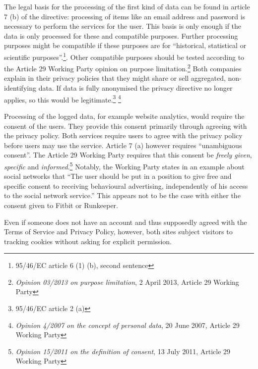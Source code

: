 \documentclass{article}
\begin{document}
The legal basis for the processing of the first kind of data can be found in article 7 (b) of the directive: processing of items like an email address and password is necessary to perform the services for the user.
This basis is only enough if the data is only processed for these and compatible purposes.
Further processing purposes might be compatible if these purposes are for ``historical, statistical or scientific purposes''.\footnote{95/46/EC article 6 (1) (b), second sentence}.
Other compatible purposes should be tested according to the Article 29 Working Party opinion on purpose limitation.\footnote{\emph{Opinion 03/2013 on purpose limitation}, 2 April 2013, Article 29 Working Party}
Both companies explain in their privacy policies that they might share or sell aggregated, non-identifying data.
If data is fully anonymised the privacy directive no longer applies, so this would be legitimate.\footnote{95/46/EC article 2 (a)} \footnote{\emph{Opinion 4/2007 on the concept of personal data}, 20 June 2007, Article 29 Working Party}

Processing of the logged data, for example website analytics, would require the consent of the users.
They provide this consent primarily through agreeing with the privacy policy.
Both services require users to agree with the privacy policy before users may use the service.
Article 7 (a) however requires ``unambiguous consent''.
The Article 29 Working Party requires that this consent be \emph{freely given}, \emph{specific} and \emph{informed}.\footnote{\emph{Opinion 15/2011 on the definition of consent}, 13 July 2011, Article 29 Working Party}
Notably, the Working Party states in an example about social networks that ``The user should be put in a position to give free and specific consent to receiving behavioural advertising, independently of his access to the social network service.''
This appears not to be the case with either the consent given to Fitbit or Runkeeper.

Even if someone does not have an account and thus supposedly agreed with the Terms of Service and Privacy Policy, however, both sites subject visitors to tracking cookies without asking for explicit permission.
\end{document}
